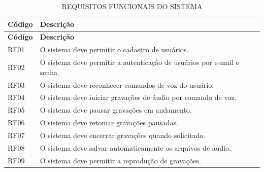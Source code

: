 \documentclass[12pt,oneside,a4paper,brazil,final]{abntex2}
\begin{document}
\begin{longtable}{|p{2.3cm}|p{12cm}|}

\caption{REQUISITOS FUNCIONAIS DO SISTEMA}

\label{tab:requisitos-funcionais}\\

\hline

\textbf{Código} & \textbf{Descrição} \\

\hline

\endfirsthead



\hline

\textbf{Código} & \textbf{Descrição} \\

\hline

\endhead



RF01 & O sistema deve permitir o cadastro de usuários. \\

\hline

RF02 & O sistema deve permitir a autenticação de usuários por e-mail e senha. \\

\hline

RF03 & O sistema deve reconhecer comandos de voz do usuário. \\

\hline

RF04 & O sistema deve iniciar gravações de áudio por comando de voz. \\

\hline

RF05 & O sistema deve pausar gravações em andamento. \\

\hline

RF06 & O sistema deve retomar gravações pausadas. \\

\hline

RF07 & O sistema deve encerrar gravações quando solicitado. \\

\hline

RF08 & O sistema deve salvar automaticamente os arquivos de áudio. \\

\hline

RF09 & O sistema deve permitir a reprodução de gravações. \\


\end{longtable}
\end{document}
